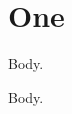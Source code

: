 \documentclass{article}
\begin{document}
\section{One}
\begin{remark}Body.\end{remark}
\begin{theorem}Body.\end{theorem}
\end{document}
